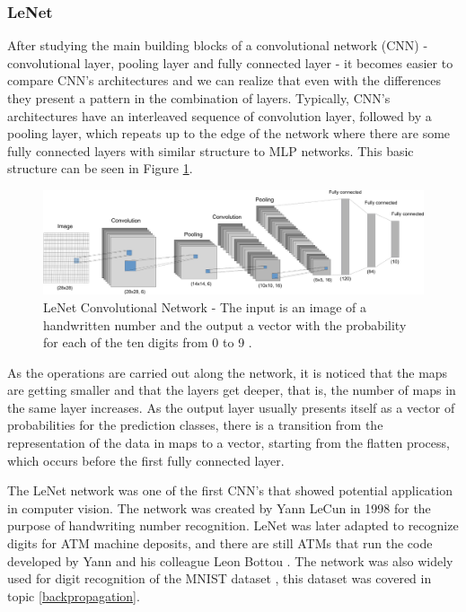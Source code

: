 \subsubsection{LeNet} \label{lenet}

After studying the main building blocks of a convolutional network (CNN) - convolutional layer, pooling layer and fully connected layer - it becomes easier to compare CNN's architectures and we can realize that even with the differences they present a pattern in the combination of layers. Typically, CNN's architectures have an interleaved sequence of convolution layer, followed by a pooling layer, which repeats up to the edge of the network where there are some fully connected layers with similar structure to MLP networks. This basic structure can be seen in Figure \ref{fig:lenet}.

\begin{figure}
    \centering
    \includegraphics[scale=0.4]{images/figure125.png}
    \caption{ LeNet Convolutional Network - The input is an image of a handwritten number and the output a vector with the probability for each of the ten digits from 0 to 9 \cite{zhang2020dive}.}
    \label{fig:lenet}
\end{figure}

As the operations are carried out along the network, it is noticed that the maps are getting smaller and that the layers get deeper, that is, the number of maps in the same layer increases. As the output layer usually presents itself as a vector of probabilities for the prediction classes, there is a transition from the representation of the data in maps to a vector, starting from the flatten process, which occurs before the first fully connected layer.

The LeNet network was one of the first CNN's that showed potential application in computer vision. The network was created by Yann LeCun in 1998 for the purpose of handwriting number recognition. LeNet was later adapted to recognize digits for ATM machine deposits, and there are still ATMs that run the code developed by Yann and his colleague Leon Bottou \cite{zhang2020dive}. The network was also widely used for digit recognition of the MNIST dataset \cite{geron2019}, this dataset was covered in topic \ref{backpropagation}.

